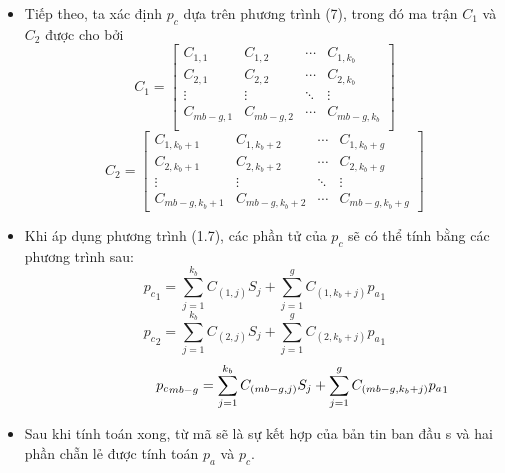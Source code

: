 \documentclass{article}
\begin{document}
\begin{itemize}
       \item  Tiếp theo, ta xác định $p_c$ dựa trên phương trình (7), trong đó ma trận $C_1$ và $C_2$ được cho bởi 
       \begin{equation}\label{129}
           C_1 = 
          \begin{bmatrix}
            C_{1,1} & C_{1,2} & \cdots & C_{1,k_b} \\
            C_{2,1} & C_{2,2} & \cdots & C_{2,k_b} \\
            \vdots  & \vdots  & \ddots & \vdots  \\
            C_{mb-g,1} & C_{mb-g,2} & \cdots & C_{mb-g,k_b}\\
          \end{bmatrix}
       \end{equation}
       \begin{equation}\label{130}
           C_2 = 
          \begin{bmatrix}
            C_{1,{k_b}+1} & C_{1,{k_b}+2} & \cdots & C_{1,{k_b}+g} \\
            C_{2,{k_b}+1} & C_{2,{k_b}+2} & \cdots & C_{2,{k_b}+g} \\
            \vdots  & \vdots  & \ddots & \vdots  \\
            C_{mb-g,{k_b}+1} & C_{mb-g,{k_b}+2} & \cdots & C_{mb-g,{k_b}+g}
          \end{bmatrix}
       \end{equation}
       \item 	Khi áp dụng phương trình (1.7), các phần tử của $p_c$ sẽ có thể tính bằng các phương trình sau:
       \begin{equation}\label{131}
            {p_c}_1 = \sum_{j=1}^{k_b} C_{(1,j)} S_j + \sum_{j=1}^{g} C_{(1,{k_b}+j)}  {p_a}_1
       \end{equation}
       \begin{equation}\label{132}
            {p_c}_2 = \sum_{j=1}^{k_b} C_{(2,j)} S_j + \sum_{j=1}^{g} C_{(2,{k_b}+j)}  {p_a}_1
       \end{equation}
       \begin{equation}\label{133}
           \hspace{1.9cm} {p_c}_{mb-g} = \sum_{j=1}^{k_b} C_{(mb-g,j)} S_j + \sum_{j=1}^{g} C_{(mb-g,{k_b}+j)}  {p_a}_1
       \end{equation}
       \item   Sau khi tính toán xong, từ mã sẽ là sự kết hợp của bản tin ban đầu s và hai phần chẵn lẻ được tính toán $p_a$ và $p_c$.

\end{itemize}
\end{document}
